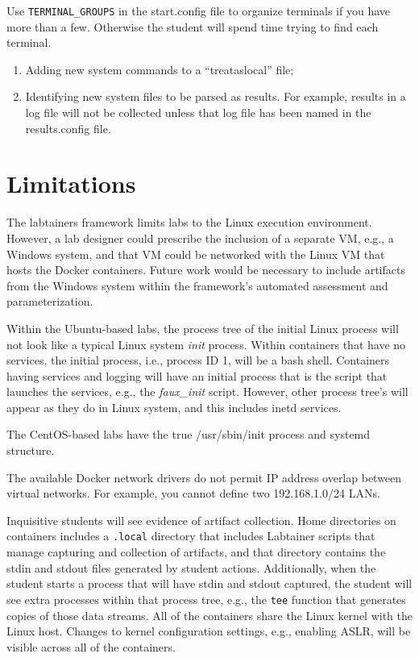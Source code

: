 \documentclass[12pt]{article}
\begin{document}
Use {\tt TERMINAL\_GROUPS} in the start.config file to organize terminals if you have more
than a few.  Otherwise the student will spend time trying to find each terminal.

\begin{enumerate}
\item Adding new system commands to a ``treataslocal'' file;
\item Identifying new system files to be parsed as results.  For example, results in a log
file will not be collected unless that log file has been named in the results.config file.
\end{enumerate}

\section{Limitations}
The labtainers framework limits labs to the Linux execution environment.
However, a lab designer could prescribe the inclusion of a separate
VM, e.g., a Windows system, and that VM could be networked with the Linux
VM that hosts the Docker containers.  Future work would be necessary to include
artifacts from the Windows system within the framework's automated assessment
and parameterization.

Within the Ubuntu-based labs, the process tree of the initial Linux process will
not look like a typical Linux system \textit{init} process.  Within containers that have no
services, the initial process, i.e., process ID 1, will be a bash shell.
Containers having services and logging will have an initial process that is
the script that launches the services, e.g., the \textit{faux\_init} script.  However,
other process tree's will appear as they
do in Linux system, and this includes inetd services.

The CentOS-based labs have the true /usr/sbin/init process and systemd structure.

The available Docker network drivers do not permit IP address overlap between virtual networks.
For example, you cannot define two 192.168.1.0/24 LANs.

Inquisitive students will see evidence of artifact collection.  Home directories
on containers includes a \texttt{.local} directory that includes Labtainer scripts that manage
capturing and collection of artifacts, and that directory contains the stdin and
stdout files generated by student actions. Additionally, when the student starts a process
that will have stdin and stdout captured, the student will see extra processes within
that process tree, e.g., the \texttt{tee} function that generates copies of those data streams.
All of the containers share the Linux kernel with the Linux host.  Changes to
kernel configuration settings, e.g., enabling ASLR, will be visible across all
of the containers.
\end{document}
